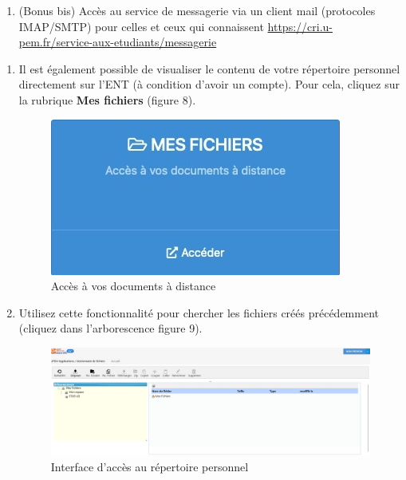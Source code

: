 \documentclass{article}
\begin{document}
\begin{exercice}
\begin{enumerate}
\item (Bonus bis) Accès au service de messagerie via un client mail (protocoles IMAP/SMTP) pour celles et ceux qui connaissent \url{https://cri.u-pem.fr/service-aux-etudiants/messagerie} 

\end{enumerate}


\end{exercice}

\begin{exercice}

\begin{enumerate}
\item Il est également possible de visualiser le contenu de votre répertoire
    personnel directement sur l'ENT (à condition d'avoir un compte). Pour cela,  cliquez sur la rubrique \textbf{Mes fichiers} (figure 8).

\begin{figure}[h!]
    \begin{center}
    \includegraphics[scale=0.25]{mesFichiers.jpg}
    \caption{Accès à vos documents à distance}
     \end{center}
\end{figure}    
        
\item Utilisez cette fonctionnalité pour chercher les fichiers créés
    précédemment (cliquez dans l'arborescence figure 9).
    
 \begin{figure}[h!]
    \begin{center}
    \includegraphics[scale=0.25]{AccesMesFichiers.jpg}
    \caption{Interface d'accès au répertoire personnel}
     \end{center}
\end{figure}    


\end{enumerate}
\end{exercice}
\end{document}
